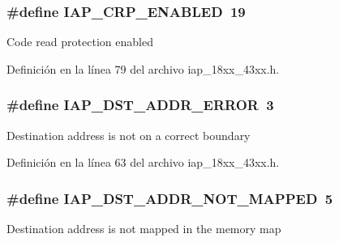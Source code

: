 \subsubsection[{\texorpdfstring{I\+A\+P\+\_\+\+C\+R\+P\+\_\+\+E\+N\+A\+B\+L\+ED}{IAP_CRP_ENABLED}}]{\setlength{\rightskip}{0pt plus 5cm}\#define I\+A\+P\+\_\+\+C\+R\+P\+\_\+\+E\+N\+A\+B\+L\+ED~19}\hypertarget{group___i_a_p__18_x_x__43_x_x_gaaccc191ce402e19b0c0ae399f614efe8}{}\label{group___i_a_p__18_x_x__43_x_x_gaaccc191ce402e19b0c0ae399f614efe8}
Code read protection enabled 

Definición en la línea 79 del archivo iap\+\_\+18xx\+\_\+43xx.\+h.

\subsubsection[{\texorpdfstring{I\+A\+P\+\_\+\+D\+S\+T\+\_\+\+A\+D\+D\+R\+\_\+\+E\+R\+R\+OR}{IAP_DST_ADDR_ERROR}}]{\setlength{\rightskip}{0pt plus 5cm}\#define I\+A\+P\+\_\+\+D\+S\+T\+\_\+\+A\+D\+D\+R\+\_\+\+E\+R\+R\+OR~3}\hypertarget{group___i_a_p__18_x_x__43_x_x_ga72a13c4c7132aa3da476fc0907cb2a08}{}\label{group___i_a_p__18_x_x__43_x_x_ga72a13c4c7132aa3da476fc0907cb2a08}
Destination address is not on a correct boundary 

Definición en la línea 63 del archivo iap\+\_\+18xx\+\_\+43xx.\+h.

\subsubsection[{\texorpdfstring{I\+A\+P\+\_\+\+D\+S\+T\+\_\+\+A\+D\+D\+R\+\_\+\+N\+O\+T\+\_\+\+M\+A\+P\+P\+ED}{IAP_DST_ADDR_NOT_MAPPED}}]{\setlength{\rightskip}{0pt plus 5cm}\#define I\+A\+P\+\_\+\+D\+S\+T\+\_\+\+A\+D\+D\+R\+\_\+\+N\+O\+T\+\_\+\+M\+A\+P\+P\+ED~5}\hypertarget{group___i_a_p__18_x_x__43_x_x_gacd5a7fb6c783f5d435e594170757d1d4}{}\label{group___i_a_p__18_x_x__43_x_x_gacd5a7fb6c783f5d435e594170757d1d4}
Destination address is not mapped in the memory map 

